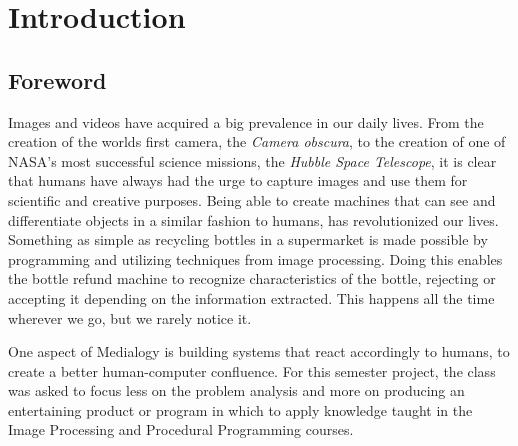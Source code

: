 \chapter{Introduction}
\section{Foreword}
Images and videos have acquired a big prevalence in our daily lives. From the creation of the worlds first camera, the \textit{Camera obscura}, to the creation of one of NASA's most successful science missions, the \textit{Hubble Space Telescope}, it is clear that humans have always had the urge to capture images and use them for scientific and creative purposes. Being able to create machines that can see and differentiate objects in a similar fashion to humans, has revolutionized our lives. Something as simple as recycling bottles in a supermarket is made possible by programming and utilizing techniques from image processing. Doing this enables the bottle refund machine to recognize characteristics of the bottle, rejecting or accepting it depending on the information extracted. This happens all the time wherever we go, but we rarely notice it.

One aspect of Medialogy is building systems that react accordingly to humans, to create a better human-computer confluence. For this semester project, the class was asked to focus less on the problem analysis and more on producing an entertaining product or program in which to apply knowledge taught in the Image Processing and Procedural Programming courses.




